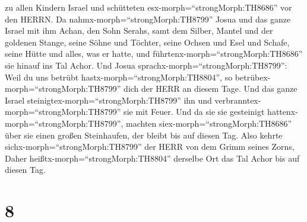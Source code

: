 zu allen Kindern Israel und schütteten esx-morph=``strongMorph:TH8686''
vor den HERRN.  Da nahmx-morph=``strongMorph:TH8799'' Josua
und das ganze Israel mit ihm Achan, den Sohn Serahs, samt dem Silber,
Mantel und der goldenen Stange, seine Söhne und Töchter, seine Ochsen
und Esel und Schafe, seine Hütte und alles, was er hatte, und
führtenx-morph=``strongMorph:TH8686'' sie hinauf ins Tal Achor.
 Und Josua sprachx-morph=``strongMorph:TH8799'': Weil du
uns betrübt hastx-morph=``strongMorph:TH8804'', so
betrübex-morph=``strongMorph:TH8799'' dich der HERR an diesem Tage. Und
das ganze Israel steinigtex-morph=``strongMorph:TH8799'' ihn und
verbranntex-morph=``strongMorph:TH8799'' sie mit Feuer. Und da sie sie
gesteinigt hattenx-morph=``strongMorph:TH8799'',  machten
siex-morph=``strongMorph:TH8686'' über sie einen großen Steinhaufen, der
bleibt bis auf diesen Tag. Also kehrte
sichx-morph=``strongMorph:TH8799'' der HERR von dem Grimm seines Zorns,
Daher heißtx-morph=``strongMorph:TH8804'' derselbe Ort das Tal Achor bis
auf diesen Tag.

\hypertarget{section-7}{%
\section{8}\label{section-7}}

